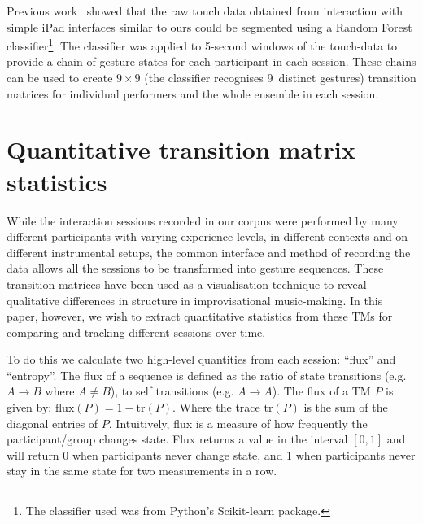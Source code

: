 \documentclass{sigchi}
\begin{document}
Previous work~\cite{Martin:2015jk} showed that the raw touch data
obtained from interaction with simple iPad interfaces similar to ours
could be segmented using a Random Forest\cite{Breiman:2001kx}
classifier\footnote{The classifier used was from Python's Scikit-learn
  package\cite{scikit-learn}.}. The classifier was applied to 5-second
windows of the touch-data to provide a chain of gesture-states for
each participant in each session. These chains can be used to create
$9 \times 9$ (the classifier recognises 9~distinct gestures)
transition matrices for individual performers and the whole ensemble
in each session.

\section{Quantitative transition matrix statistics}
\label{sec:underst-impr-group}

While the interaction sessions recorded in our corpus were performed
by many different participants with varying experience levels, in
different contexts and on different instrumental setups, the common
interface and method of recording the data allows all the sessions to
be transformed into gesture sequences. These transition matrices have
been used as a visualisation technique to reveal qualitative
differences in structure in improvisational
music-making\cite{Swift:2014tya}. In this paper, however, we wish to
extract quantitative statistics from these TMs for comparing and
tracking different sessions over time.

To do this we calculate two high-level quantities from each session:
``flux'' and ``entropy''. The flux of a sequence is defined as the
ratio of state transitions (e.g. $A \rightarrow B$ where $A \neq B$),
to self transitions (e.g. $A \rightarrow A $). The flux of a TM $P$ is
given by: $\mathrm{flux}(P) = 1 - \mathrm{tr}(P)$. Where the trace
$\mathrm{tr}(P)$ is the sum of the diagonal entries of $P$.
Intuitively, flux is a measure of how frequently the participant/group
changes state. Flux returns a value in the interval $[0,1]$ and will
return 0 when participants never change state, and 1 when participants
never stay in the same state for two measurements in a row.
\end{document}
